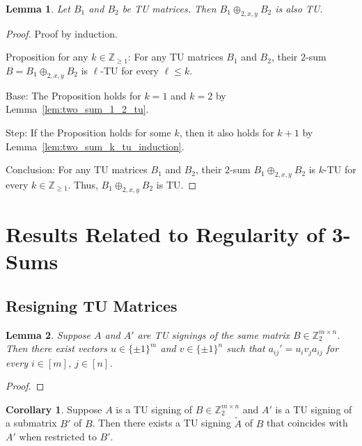 \documentclass{article}
\newtheorem{lemma}{Lemma}
\theoremstyle{definition}
\newtheorem{corollary}{Corollary}
\begin{document}
\begin{lemma}\label{lem:two_sum_tu}
    Let $B_{1}$ and $B_{2}$ be TU matrices. Then $B_{1} \oplus_{2, x, y} B_{2}$ is also TU.
\end{lemma}

\begin{proof}
    Proof by induction.

    Proposition for any $k \in \mathbb{Z}_{\geq 1}$: For any TU matrices $B_{1}$ and $B_{2}$, their $2$-sum $B = B_{1} \oplus_{2, x, y} B_{2}$ is $\ell$-TU for every $\ell \leq k$.

    Base: The Proposition holds for $k = 1$ and $k = 2$ by Lemma~\ref{lem:two_sum_1_2_tu}.

    Step: If the Proposition holds for some $k$, then it also holds for $k + 1$ by Lemma~\ref{lem:two_sum_k_tu_induction}.

    Conclusion: For any TU matrices $B_{1}$ and $B_{2}$, their $2$-sum $B_{1} \oplus_{2, x, y} B_{2}$ is $k$-TU for every $k \in \mathbb{Z}_{\geq 1}$. Thus, $B_{1} \oplus_{2, x, y} B_{2}$ is TU.
\end{proof}


\section{Results Related to Regularity of 3-Sums}

\subsection{Resigning TU Matrices}

\begin{lemma}\label{lem:tu_resigning}
    Suppose $A$ and $A'$ are TU signings of the same matrix $B \in \mathbb{Z}_{2}^{m \times n}$. Then there exist vectors $u \in \{\pm 1\}^{m}$ and $v \in \{\pm 1\}^{n}$ such that $a_{ij}' = u_{i} v_{j} a_{ij}$ for every $i \in [m]$, $j \in [n]$.
\end{lemma}

\begin{proof}
\end{proof}

\begin{corollary}\label{cor:tu_resigning_submatrix}
    Suppose $A$ is a TU signing of $B \in \mathbb{Z}_{2}^{m \times n}$ and $A'$ is a TU signing of a submatrix $B'$ of $B$. Then there exists a TU signing $\tilde{A}$ of $B$ that coincides with $A'$ when restricted to $B'$.
\end{corollary}
\end{document}
